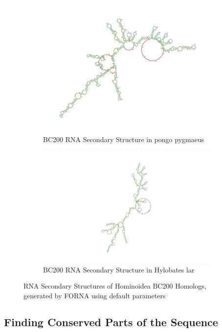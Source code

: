 \documentclass[conference]{IEEEtran}
\begin{document}
\begin{figure}[h]
\begin{subfigure}[b]{0.4\textwidth}
    \includegraphics[width=\textwidth]{figs/rnapongo.png}
    \caption{BC200 RNA Secondary Structure in pongo pygmaeus}
    \label{fig:pongo-structure}
  \end{subfigure}
  \hfill
  \begin{subfigure}[b]{0.4\textwidth}   
    \centering
    \includegraphics[width=\textwidth]{figs/rnahylobates.png}
    \caption{BC200 RNA Secondary Structure in Hylobates lar}
    \label{fig:hylobates-structure}
  \end{subfigure}
  \caption{RNA Secondary Structures of Hominoidea BC200 Homologs, generated by FORNA \cite{kerpedjiev2015forna} using default parameters}
  \label{fig:rna-sec-structure}
\end{figure}

\subsection{Finding Conserved Parts of the Sequence}
\end{document}
